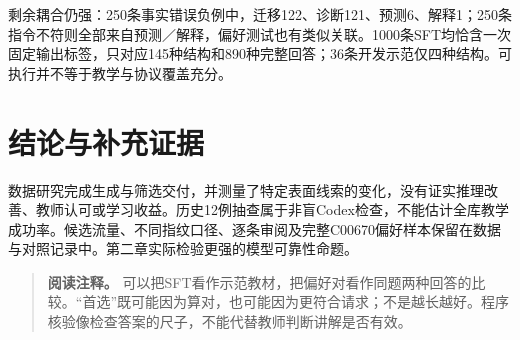 剩余耦合仍强：250条事实错误负例中，迁移122、诊断121、预测6、解释1；250条指令不符则全部来自预测／解释，偏好测试也有类似关联。1000条SFT均恰含一次固定输出标签，只对应145种结构和890种完整回答；36条开发示范仅四种结构。可执行并不等于教学与协议覆盖充分。

\section{结论与补充证据}
数据研究完成生成与筛选交付，并测量了特定表面线索的变化，没有证实推理改善、教师认可或学习收益。历史12例抽查属于非盲Codex检查，不能估计全库教学成功率。候选流量、不同指纹口径、逐条审阅及完整C00670偏好样本保留在数据与对照记录中。第二章实际检验更强的模型可靠性命题。

\begin{quote}\small\textbf{阅读注释。} 可以把SFT看作示范教材，把偏好对看作同题两种回答的比较。“首选”既可能因为算对，也可能因为更符合请求；不是越长越好。程序核验像检查答案的尺子，不能代替教师判断讲解是否有效。
\end{quote}
